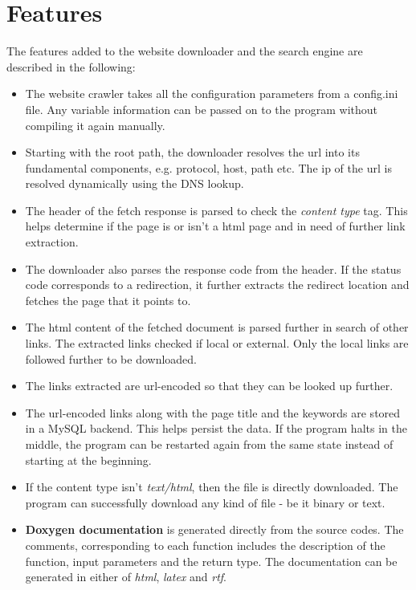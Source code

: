 \documentclass{project_report}
\begin{document}
\section{Features}
The features added to the website downloader and the search engine are described in the following:
\begin{itemize}
	\item The website crawler takes all the configuration parameters from a config.ini file. Any variable information can be passed on to the program without compiling it again manually.
	\item Starting with the root path, the downloader resolves the url into its fundamental components, e.g. protocol, host, path etc. The ip of the url is resolved dynamically using the DNS lookup.
	\item The header of the fetch response is parsed to check the \emph{content type} tag. This helps determine if the page is or isn't a html page and in need of further link extraction.
	\item The downloader also parses the response code from the header. If the status code corresponds to a redirection, it further extracts the redirect location and fetches the page that it points to.
	\item The html content of the fetched document is parsed further in search of other links. The extracted links checked if local or external. Only the local links are followed further to be downloaded.
	\item The links extracted are url-encoded so that they can be looked up further.
	\item The url-encoded links along with the page title and the keywords are stored in a MySQL backend. This helps persist the data. If the program halts in the middle, the program can be restarted again from the same state instead of starting at the beginning.
	\item If the content type isn't \emph{text/html}, then the file is directly downloaded. The program can successfully download any kind of file - be it binary or text.
	\item \textbf{Doxygen documentation} is generated directly from the source codes. The comments, corresponding to each function includes the description of the function, input parameters and the return type. The documentation can be generated in either of \emph{html}, \emph{latex} and \emph{rtf}.
\end{itemize}
\end{document}
